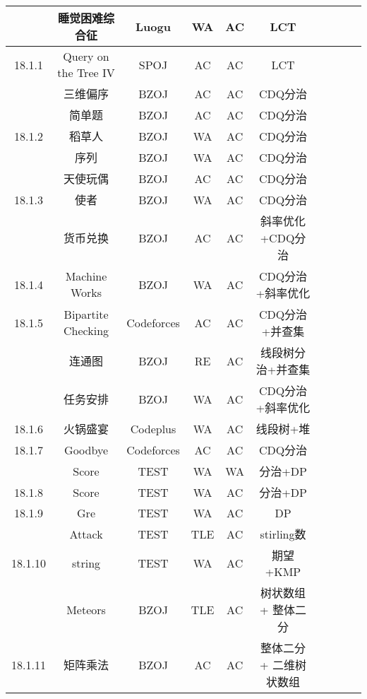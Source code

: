 \documentclass[landscape]{article}
\begin{document}
\begin{longtable}{cccccccccc}
  & 睡觉困难综合征 & Luogu & WA & AC & LCT\\
  \hline
  18.1.1 & Query on the Tree IV & SPOJ & AC & AC & LCT\\
  & 三维偏序 & BZOJ & AC & AC & CDQ分治\\
  & 简单题 & BZOJ & AC & AC & CDQ分治\\
  \hline
  18.1.2 & 稻草人 & BZOJ & WA & AC & CDQ分治\\
  & 序列 & BZOJ & WA & AC & CDQ分治\\
  & 天使玩偶 & BZOJ & AC & AC & CDQ分治\\
  \hline
  18.1.3 & 使者 & BZOJ & WA & AC & CDQ分治\\
  & 货币兑换 & BZOJ & AC & AC & 斜率优化+CDQ分治\\
  \hline
  18.1.4 & Machine Works & BZOJ & WA & AC & CDQ分治+斜率优化\\
  \hline
  18.1.5 & Bipartite Checking & Codeforces & AC & AC & CDQ分治+并查集\\
  & 连通图 & BZOJ & RE & AC & 线段树分治+并查集\\
  & 任务安排 & BZOJ & WA & AC & CDQ分治+斜率优化\\
  \hline
  18.1.6 & 火锅盛宴 & Codeplus & WA & AC & 线段树+堆\\
  \hline
  18.1.7 & Goodbye & Codeforces & AC & AC & CDQ分治\\
  & Score & TEST & WA & WA & 分治+DP\\
  \hline
  18.1.8 & Score & TEST & WA & AC & 分治+DP\\
  \hline
  18.1.9 & Gre & TEST & WA & AC & DP\\
  & Attack & TEST & TLE & AC & stirling数\\
  \hline
  18.1.10 & string & TEST & WA & AC & 期望+KMP\\
  & Meteors & BZOJ & TLE & AC & 树状数组 + 整体二分\\
  \hline
  18.1.11 & 矩阵乘法 & BZOJ & AC & AC & 整体二分 + 二维树状数组\\
\end{longtable}
\end{document}
